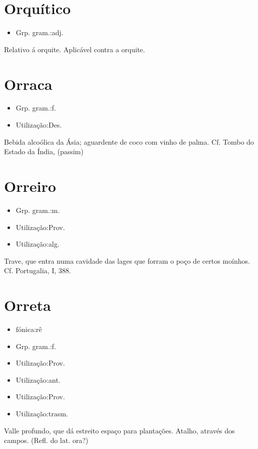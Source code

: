 \section{Orquítico}
\begin{itemize}
\item {Grp. gram.:adj.}
\end{itemize}
Relativo á orquite.
Aplicável contra a orquite.
\section{Orraca}
\begin{itemize}
\item {Grp. gram.:f.}
\end{itemize}
\begin{itemize}
\item {Utilização:Des.}
\end{itemize}
Bebida alcoólica da Ásia; aguardente de coco com vinho de palma. Cf. \textunderscore Tombo do Estado da Índia\textunderscore , (\textunderscore passim\textunderscore )
\section{Orreiro}
\begin{itemize}
\item {Grp. gram.:m.}
\end{itemize}
\begin{itemize}
\item {Utilização:Prov.}
\end{itemize}
\begin{itemize}
\item {Utilização:alg.}
\end{itemize}
Trave, que entra numa cavidade das lages que forram o poço de certos moínhos. Cf. \textunderscore Portugalia\textunderscore , I, 388.
\section{Orreta}
\begin{itemize}
\item {fónica:rê}
\end{itemize}
\begin{itemize}
\item {Grp. gram.:f.}
\end{itemize}
\begin{itemize}
\item {Utilização:Prov.}
\end{itemize}
\begin{itemize}
\item {Utilização:ant.}
\end{itemize}
\begin{itemize}
\item {Utilização:Prov.}
\end{itemize}
\begin{itemize}
\item {Utilização:trasm.}
\end{itemize}
Valle profundo, que dá estreito espaço para plantações.
Atalho, através dos campos.
(Refl. do lat. \textunderscore ora\textunderscore ?)
